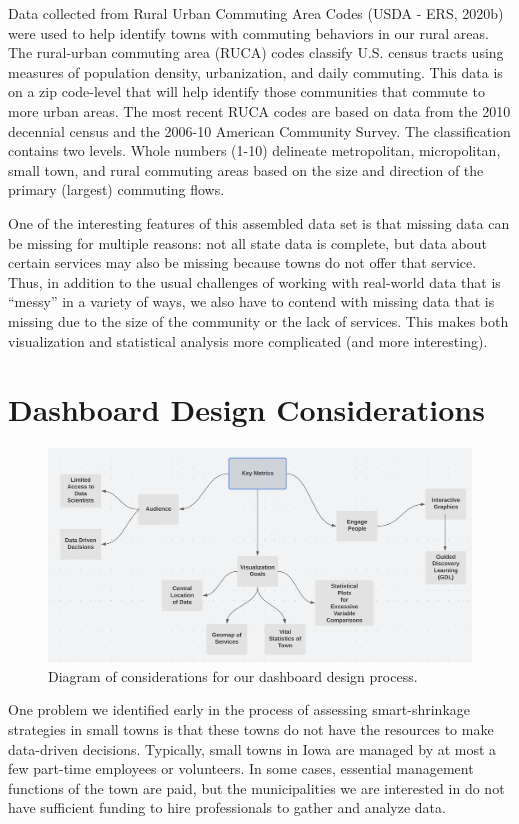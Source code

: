 \documentclass[print]{nuthesis}
\begin{document}
Data collected from Rural Urban Commuting Area Codes (USDA - ERS, 2020b) were used to help identify towns with commuting behaviors in our rural areas. The rural-urban commuting area (RUCA) codes classify U.S. census tracts using measures of population density, urbanization, and daily commuting. This data is on a zip code-level that will help identify those communities that commute to more urban areas. The most recent RUCA codes are based on data from the 2010 decennial census and the 2006-10 American Community Survey. The classification contains two levels. Whole numbers (1-10) delineate metropolitan, micropolitan, small town, and rural commuting areas based on the size and direction of the primary (largest) commuting flows.

One of the interesting features of this assembled data set is that missing data can be missing for multiple reasons: not all state data is complete, but data about certain services may also be missing because towns do not offer that service.
Thus, in addition to the usual challenges of working with real-world data that is ``messy'' in a variety of ways, we also have to contend with missing data that is missing due to the size of the community or the lack of services. This makes both visualization and statistical analysis more complicated (and more interesting).

\hypertarget{dashboard-design-considerations}{%
\section{Dashboard Design Considerations}\label{dashboard-design-considerations}}

\begin{figure}
\includegraphics[width=.8\textwidth]{figure/Key_Metrics}
\caption{Diagram of considerations for our dashboard design process.}\label{fig:metrics}
\end{figure}

One problem we identified early in the process of assessing smart-shrinkage strategies in small towns is that these towns do not have the resources to make data-driven decisions. Typically, small towns in Iowa are managed by at most a few part-time employees or volunteers. In some cases, essential management functions of the town are paid, but the municipalities we are interested in do not have sufficient funding to hire professionals to gather and analyze data.
\end{document}

